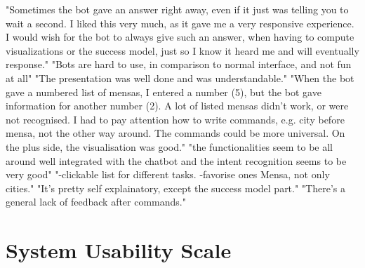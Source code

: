 \begin{appendices}
\bigbreak
"Sometimes the bot gave an answer right away, even if it just was telling you to wait a second. I liked this very much, as it gave me a very responsive experience. I would wish for the bot to always give such an answer, when having to compute visualizations or the success model, just so I know it heard me and will eventually response."
\bigbreak
"Bots are hard to use, in comparison to normal interface, and not fun at all"
\bigbreak
"The presentation was well done and was understandable."
\bigbreak
"When the bot gave a numbered list of mensas, I entered a number  (5), but the bot gave information for another number (2).
A lot of listed mensas didn't work, or were not recognised.
I had to pay attention how to write commands, e.g. city before mensa, not the other way around. The commands could be more universal.
On the plus side, the visualisation was good."
\bigbreak
"the functionalities seem to be all around well integrated with the chatbot and the intent recognition seems to be very good"
\bigbreak
"-clickable list for different tasks.\newline
-favorise ones Mensa, not only cities."
\bigbreak
"It's pretty self explainatory, except the success model part."
\bigbreak
"There's a general lack of feedback after commands."

\section{System Usability Scale}

\end{appendices}

